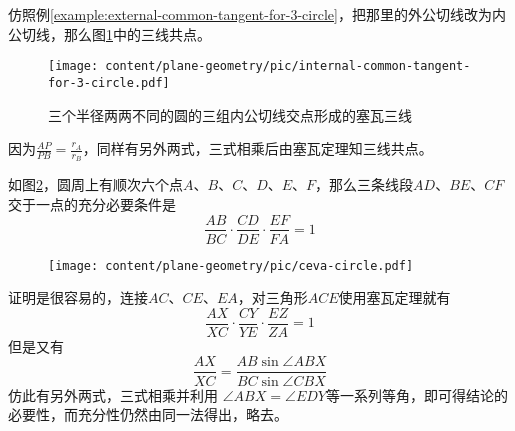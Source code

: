 \begin{example}
  仿照例\ref{example:external-common-tangent-for-3-circle}，把那里的外公切线改为内公切线，那么图\ref{fig:internal-common-tangent-for-3-circle}中的三线共点。
 
\begin{figure}[htbp]
\centering
\texttt{[image: content/plane-geometry/pic/internal-common-tangent-for-3-circle.pdf]}
\caption{三个半径两两不同的圆的三组内公切线交点形成的塞瓦三线}
\label{fig:internal-common-tangent-for-3-circle}
\end{figure}

因为$\frac{AP}{PB}=\frac{r_A}{r_B}$，同样有另外两式，三式相乘后由塞瓦定理知三线共点。
\end{example}

\begin{example}
  如图\ref{fig:ceva-circle}，圆周上有顺次六个点$A$、$B$、$C$、$D$、$E$、$F$，那么三条线段$AD$、$BE$、$CF$交于一点的充分必要条件是
  \begin{equation*}
    \frac{AB}{BC} \cdot \frac{CD}{DE} \cdot \frac{EF}{FA} = 1
  \end{equation*}
 
\begin{figure}[htbp]
\centering
\texttt{[image: content/plane-geometry/pic/ceva-circle.pdf]}
\caption{}
\label{fig:ceva-circle}
\end{figure}

证明是很容易的，连接$AC$、$CE$、$EA$，对三角形$ACE$使用塞瓦定理就有
\begin{equation*}
  \frac{AX}{XC} \cdot \frac{CY}{YE} \cdot \frac{EZ}{ZA} = 1
\end{equation*}
但是又有
\begin{equation*}
  \frac{AX}{XC} = \frac{AB \sin{\angle ABX}}{BC \sin{\angle CBX}}
\end{equation*}
仿此有另外两式，三式相乘并利用 $\angle ABX = \angle EDY$等一系列等角，即可得结论的必要性，而充分性仍然由同一法得出，略去。
\end{example}

